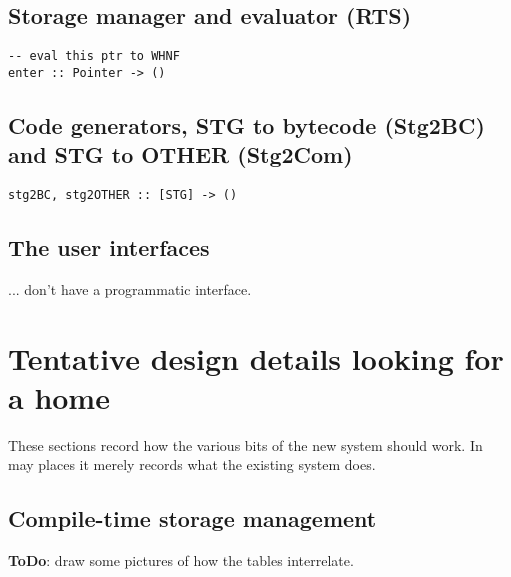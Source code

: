 \subsection{Storage manager and evaluator (RTS)}
\begin{verbatim}
-- eval this ptr to WHNF
enter :: Pointer -> ()
\end{verbatim}



\subsection{Code generators, STG to bytecode (Stg2BC) and STG to OTHER
      (Stg2Com)}
\begin{verbatim}
stg2BC, stg2OTHER :: [STG] -> ()
\end{verbatim}


\subsection{The user interfaces}
... don't have a programmatic interface.




\section{Tentative design details looking for a home}

These sections record how the various bits of the new system
should work.  In may places it merely records what the existing
system does.

\subsection{Compile-time storage management}
{\bf ToDo}: draw some pictures of how the tables interrelate.

